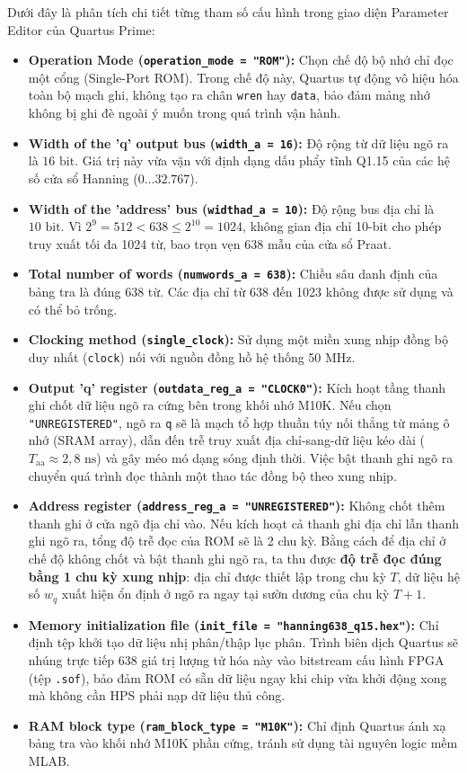 Dưới đây là phân tích chi tiết từng tham số cấu hình trong giao diện Parameter Editor của Quartus Prime:
\begin{itemize}[leftmargin=1.5em, itemsep=3pt]
    \item \textbf{Operation Mode (\texttt{operation\_mode = "ROM"}):} Chọn chế độ bộ nhớ chỉ đọc một cổng (Single-Port ROM). Trong chế độ này, Quartus tự động vô hiệu hóa toàn bộ mạch ghi, không tạo ra chân \texttt{wren} hay \texttt{data}, bảo đảm mảng nhớ không bị ghi đè ngoài ý muốn trong quá trình vận hành.
    \item \textbf{Width of the 'q' output bus (\texttt{width\_a = 16}):} Độ rộng từ dữ liệu ngõ ra là $16\text{ bit}$. Giá trị này vừa vặn với định dạng dấu phẩy tĩnh Q1.15 của các hệ số cửa sổ Hanning ($0 \dots 32.767$).
    \item \textbf{Width of the 'address' bus (\texttt{widthad\_a = 10}):} Độ rộng bus địa chỉ là $10\text{ bit}$. Vì $2^9 = 512 < 638 \le 2^{10} = 1024$, không gian địa chỉ 10-bit cho phép truy xuất tối đa 1024 từ, bao trọn vẹn $638\text{ mẫu}$ của cửa sổ Praat.
    \item \textbf{Total number of words (\texttt{numwords\_a = 638}):} Chiều sâu danh định của bảng tra là đúng 638 từ. Các địa chỉ từ 638 đến 1023 không được sử dụng và có thể bỏ trống.
    \item \textbf{Clocking method (\texttt{single\_clock}):} Sử dụng một miền xung nhịp đồng bộ duy nhất (\texttt{clock}) nối với nguồn đồng hồ hệ thống 50 MHz.
    \item \textbf{Output 'q' register (\texttt{outdata\_reg\_a = "CLOCK0"}):} Kích hoạt tầng thanh ghi chốt dữ liệu ngõ ra cứng bên trong khối nhớ M10K. Nếu chọn \texttt{"UNREGISTERED"}, ngõ ra \texttt{q} sẽ là mạch tổ hợp thuần túy nối thẳng từ mảng ô nhớ (SRAM array), dẫn đến trễ truy xuất địa chỉ-sang-dữ liệu kéo dài ($T_{\text{aa}} \approx 2{,}8\text{ ns}$) và gây méo mó dạng sóng định thời. Việc bật thanh ghi ngõ ra chuyển quá trình đọc thành một thao tác đồng bộ theo xung nhịp.
    \item \textbf{Address register (\texttt{address\_reg\_a = "UNREGISTERED"}):} Không chốt thêm thanh ghi ở cửa ngõ địa chỉ vào. Nếu kích hoạt cả thanh ghi địa chỉ lẫn thanh ghi ngõ ra, tổng độ trễ đọc của ROM sẽ là 2 chu kỳ. Bằng cách để địa chỉ ở chế độ không chốt và bật thanh ghi ngõ ra, ta thu được \textbf{độ trễ đọc đúng bằng 1 chu kỳ xung nhịp}: địa chỉ được thiết lập trong chu kỳ $T$, dữ liệu hệ số $w_q$ xuất hiện ổn định ở ngõ ra ngay tại sườn dương của chu kỳ $T+1$.
    \item \textbf{Memory initialization file (\texttt{init\_file = "hanning638\_q15.hex"}):} Chỉ định tệp khởi tạo dữ liệu nhị phân/thập lục phân. Trình biên dịch Quartus sẽ nhúng trực tiếp 638 giá trị lượng tử hóa này vào bitstream cấu hình FPGA (tệp \texttt{.sof}), bảo đảm ROM có sẵn dữ liệu ngay khi chip vừa khởi động xong mà không cần HPS phải nạp dữ liệu thủ công.
    \item \textbf{RAM block type (\texttt{ram\_block\_type = "M10K"}):} Chỉ định Quartus ánh xạ bảng tra vào khối nhớ M10K phần cứng, tránh sử dụng tài nguyên logic mềm MLAB.
\end{itemize}

